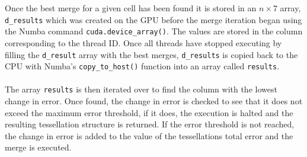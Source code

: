 Once the best merge for a given cell has been found it is stored in an $n \times 7$ array, \texttt{d\_results} which was created on the GPU before the merge iteration began using the Numba command \texttt{cuda.device\_array()}. The values are stored in the column corresponding to the thread ID. Once all threads have stopped executing by filling the \texttt{d\_result} array with the best merges, \texttt{d\_results} is copied back to the CPU with Numba's \texttt{copy\_to\_host()} function into an array called \texttt{results}.
\\
\\
The array \texttt{results} is then iterated over to find the column with the lowest change in error. Once found, the change in error is checked to see that it does not exceed the maximum error threshold, if it does, the execution is halted and the resulting tessellation structure is returned. If the error threshold is not reached, the change in error is added to the value of the tessellations total error and the merge is executed.